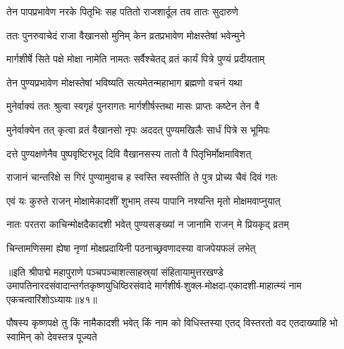 \twolineshloka
{तेन पापप्रभावेण नरके पितृभिः सह}
{पतितो राजशार्दूल तव तातः सुदारुणे}%

\twolineshloka
{ततः पुनरुवाचेदं राजा वैखानसो मुनिम्}
{केन व्रतप्रभावेण मोक्षस्तेषां भवेन्मुने}%


\twolineshloka
{मार्गशीर्षे सिते पक्षे मोक्षा नामेति नामतः}
{सर्वैश्चेतद् व्रतं कार्यं पित्रे पुण्यं प्रदीयताम्}%

\twolineshloka
{तेन पुण्यप्रभावेण मोक्षस्तेषां भविष्यति}
{सत्यमेतन्महाभाग ब्रह्मणो वचनं यथा}%

\twolineshloka
{मुनेर्वाक्यं ततः श्रुत्वा स्वगृहं पुनरागतः}
{मार्गशीर्षस्तथा मासः प्राप्तः कष्टेन तेन वै}%

\twolineshloka
{मुनेर्वाक्येन तत् कृत्वा व्रतं वैखानसो नृपः}
{अददत् पुण्यमखिलैः सार्धं पित्रे स भूमिपः}%

\twolineshloka
{दत्ते पुण्यक्षणेनैव पुष्पवृष्टिरभूद् दिवि}
{वैखानसस्य तातो वै पितृभिर्मोक्षमाविशत्}%

\twolineshloka
{राजानं चान्तरिक्षे स गिरं पुण्यामुवाच ह}
{स्वस्ति स्वस्तीति ते पुत्र प्रोच्य चैवं दिवं गतः}%

\twolineshloka
{एवं यः कुरुते राजन् मोक्षामेकादशीं शुभाम्}
{तस्य पापानि नश्यन्ति मृतो मोक्षमवाप्नुयात्}%

\twolineshloka
{नातः परतरा काचिन्मोक्षदैकादशी भवेत्}
{पुण्यसङ्ख्यां न जानामि राजन् मे प्रियकृद् व्रतम्}%

\twolineshloka
{चिन्तामणिसमा ह्येषा नृणां मोक्षप्रदायिनी}
{पठनाच्छ्रवणादस्या वाजपेयफलं लभेत्}%

॥इति श्रीपाद्मे महापुराणे पञ्चपञ्चाशत्साहस्र्यां संहितायामुत्तरखण्डे उमापतिनारदसंवादान्तर्गतकृष्णयुधिष्ठिरसंवादे मार्गशीर्ष-शुक्ल-मोक्षदा-एकादशी-माहात्म्यं नाम एकचत्वारिंशोऽध्यायः॥४१॥

\genMangalaShloka

\hyperref[sec:ekadashi_mahatmyam_padma_puranam]{\closesub}
\clearpage

\label{sec:padma-pausha-krishna-saphala}

\ganapatyadiDhyanam
\padmaPuranam



\threelineshloka
{पौषस्य  कृष्णपक्षे तु किं नामैकादशी भवेत्}
{किं नाम को विधिस्तस्या एतद् विस्तरतो वद}
{एतदाख्याहि भो स्वामिन् को देवस्तत्र पूज्यते}%

